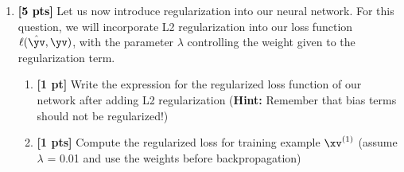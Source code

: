 \begin{enumerate}
     \begin{enumerate}
        \item \textbf{[1 pt]} What is the updated value of ${\beta}_{2,1}$?
        
        \begin{tcolorbox}[fit,height=1cm, width=2cm, blank, borderline={1pt}{-2pt}]
        \end{tcolorbox}
        
        
        \item \textbf{[1 pt]} What is the updated weight of the hidden layer bias term applied to $y_1$ (i.e. ${\beta}_{1,0}$)?
        
        \begin{tcolorbox}[fit,height=1cm, width=2cm, blank, borderline={1pt}{-2pt}]
        \end{tcolorbox}
        
        \item \textbf{[1 pt]} What is the updated value of ${\alpha}_{3,4}$?
        
        \begin{tcolorbox}[fit,height=1cm, width=2cm, blank, borderline={1pt}{-2pt}]
        \end{tcolorbox}
        
    \end{enumerate}

    \newpage

\item \textcolor{black}{\textbf{[5 pts]}} Let us now introduce regularization into our neural network. For this question, we will incorporate L2 regularization into our loss function $\ell(\hat{\yv},\yv)$, with the parameter $\lambda$ controlling the weight given to the regularization term. 
\begin{enumerate}
    \item \textbf{[1 pt]} Write the expression for the regularized loss function of our network after adding L2 regularization (\textbf{Hint:} Remember that bias terms should not be regularized!) 
    \begin{tcolorbox}[fit,height=3cm, width=15cm, blank, borderline={1pt}{-2pt}]
    \end{tcolorbox}
    
    \item \textbf{[1 pts]} Compute the regularized loss for training example $\xv^{(1)}$ (assume $\lambda$ = 0.01 and use the weights before backpropagation)
    \begin{tcolorbox}[fit,height=1cm, width=2cm, blank, borderline={1pt}{-2pt}]
    \end{tcolorbox}   
    

\end{enumerate}
\end{enumerate}
